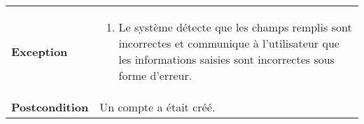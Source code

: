 \begin{longtable}{p{4cm} p{9cm}}
                    \\
                        \textbf{Exception} &
                            \begin{enumerate}
                                \item Le système détecte que les champs remplis sont
                                incorrectes et communique à l’utilisateur que les
                                informations saisies sont incorrectes sous forme
                                d’erreur.
                            \end{enumerate}
                    \\
                        \textbf{Postcondition} & Un compte a était créé.    
                \\\bottomrule
            \end{longtable}

